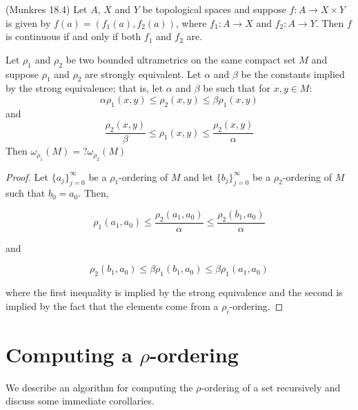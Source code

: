 \begin{proposition*} (Munkres 18.4)
Let $A$, $X$ and $Y$ be topological spaces and suppose $f: A \rightarrow X \times Y$  is given by $f(a) = (f_1(a), f_2(a))$, where $f_1:A \rightarrow X$ and $f_2:A \rightarrow Y$. Then $f$ is continuous if and only if both $f_1$ and $f_2$ are.  
\end{proposition*}

\newpage
\begin{proposition*}
Let $\rho_1$ and $\rho_2$ be two bounded ultrametrics on the same compact set $M$ and suppose $\rho_1$ and $\rho_2$ are strongly equivalent. Let $\alpha$ and $\beta$ be the constants implied by the strong equivalence; that is, let  $\alpha$ and $\beta$ be such that for $x,y \in M$:
\[\alpha \rho_1(x,y) \leq \rho_2(x,y) \leq \beta\rho_1(x,y)\]
and
\[\frac{\rho_2(x,y)}{\beta}  \leq \rho_1(x,y) \leq \frac{\rho_2(x,y)}{\alpha} \]
 Then $\omega_{\rho_1}(M) = ? \omega_{\rho_2}(M)$
\end{proposition*}

\begin{proof}
Let $\{a_j\}_{j=0}^\infty$ be a  $\rho_1$-ordering of $M$ and let $\{b_j\}_{j=0}^\infty$ be a $\rho_2$-ordering of $M$ such that $b_0=a_0$. Then,

\[\rho_1(a_1,a_0) \leq  \frac{\rho_2(a_1,a_0)}{\alpha} \leq  \frac{\rho_2(b_1,a_0)}{\alpha}\]

and 

\[\rho_2(b_1,a_0) \leq  \beta\rho_1(b_1,a_0) \leq  \beta\rho_1(a_1,a_0)\]

where the first inequality is implied by the strong equivalence and the second is implied by the fact that the elements come from a $\rho_i$-ordering.

\end{proof}

\newpage
\section*{Computing a $\rho$-ordering}
We describe an algorithm for computing the $\rho$-ordering of a set recursively and discuss some immediate corollaries.  \\

